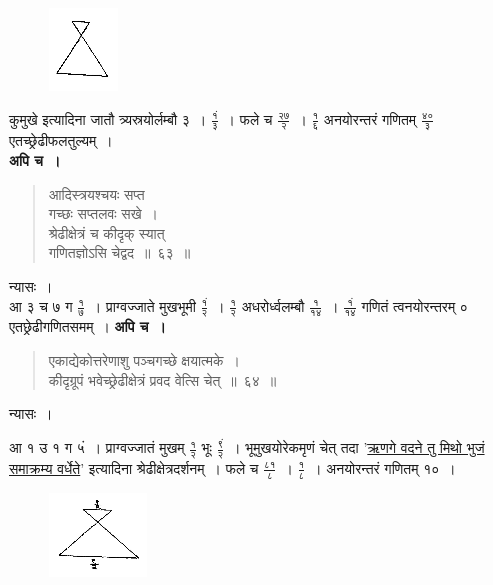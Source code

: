 \documentclass[11pt, openany]{book}
\begin{document}
\begin{figure}[h!]
    \centering
    \includegraphics[scale=0.85]{graphics/capture89.png}
\end{figure}
\vspace{-2mm}

\noindent कुमुखे इत्यादिना जातौ त्र्यस्रयोर्लम्बौ ३~। $\frac{\mbox{१ं}}{\mbox{३}}$~। फले च $\frac{\mbox{२७}}{\mbox{२}}$~। $\frac{\mbox{१}}{\mbox{६}}$ अनयोरन्तरं गणितम् $\frac{\mbox{४०}}{\mbox{३}}$ एतच्छ्रेढीफलतुल्यम्~। \\

\textbf{अपि च~।} 
\begin{quote}
    \bqt 
     आदिस्त्रयश्चयः सप्त \\
     गच्छः सप्तलवः सखे~।\\
श्रेढीक्षेत्रं च कीदृक् स्यात् \\
गणितज्ञोऽसि चेद्वद~॥~६३~॥
\end{quote}

न्यासः~। \\

\vspace{-2mm}
आ ३ च ७ ग $\frac{\mbox{१}}{\mbox{७}}$~। प्राग्वज्जाते मुखभूमी $\frac{\mbox{१ं}}{\mbox{२}}$~। $\frac{\mbox{१}}{\mbox{२}}$ अधरोर्ध्वलम्बौ $\frac{\mbox{१}}{\mbox{१४}}$~। $\frac{\mbox{१ं}}{\mbox{१४}}$ गणितं त्वनयोरन्तरम् ० एतछ्रेढीगणितसमम्~। 
\newpage
\textbf{अपि च~।} 
\begin{quote}
    \bqt 
    एकाद्येकोत्तरेणाशु पञ्चगच्छे क्षयात्मके~।\\
कीदृग्रूपं भवेच्छ्रेढीक्षेत्रं प्रवद वेत्सि चेत्~॥~६४~॥
\end{quote}

न्यासः~। \\
\vspace{-3mm}

आ १ उ १ ग ५ं~। प्राग्वज्जातं मुखम् $\frac{\mbox{१}}{\mbox{२}}$ भूः $\frac{\mbox{९ं}}{\mbox{२}}$~। भूमुखयोरेकमृणं चेत् तदा '\hyperref[4.74]{ऋणगे वदने तु मिथो भुजं समाक्रम्य वर्धेते}' इत्यादिना श्रेढीक्षेत्रदर्शनम्~। फले च $\frac{\mbox{८१}}{\mbox{८}}$~। $\frac{\mbox{१}}{\mbox{८}}$~। अनयोरन्तरं गणितम् १०~। 
\vspace{-2mm}

\begin{figure}[h!]
    \centering
    \includegraphics[scale=0.85]{graphics/capture90.png}
\end{figure}
\vspace{-2mm}
\end{document}

